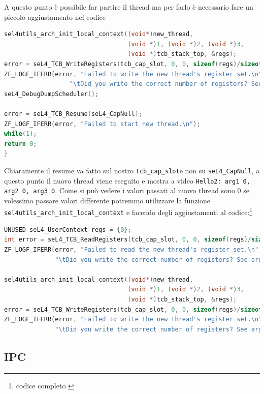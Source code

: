 A questo punto è possibile far partire il thread ma per farlo è necessario fare un piccolo aggiustamento nel codice 
\begin{lstlisting}[language=C++]
sel4utils_arch_init_local_context((void*)new_thread,
                                  (void *)1, (void *)2, (void *)3,
                                  (void *)tcb_stack_top, &regs);
error = seL4_TCB_WriteRegisters(tcb_cap_slot, 0, 0, sizeof(regs)/sizeof(seL4_Word), &regs);
ZF_LOGF_IFERR(error, "Failed to write the new thread's register set.\n"
                  "\tDid you write the correct number of registers? See arg4.\n");
seL4_DebugDumpScheduler();

error = seL4_TCB_Resume(seL4_CapNull);
ZF_LOGF_IFERR(error, "Failed to start new thread.\n");
while(1);
return 0;
}
\end{lstlisting}
Chiaramente il resume va fatto sul nostro \texttt{tcb\_cap\_slot}e non su \texttt{seL4\_CapNull}, a questo punto il nuovo thread viene eseguito e mostra a video \texttt{Hello2: arg1 0, arg2 0, arg3 0}.
Come si può vedere i valori passati al nuovo thread sono 0 se volessimo passare valori differente potremmo utilizzare la funzione \texttt{sel4utils\_arch\_init\_local\_context} e facendo degli aggiustamenti al codice:\footnote{codice completo \cite{threads}}
\begin{lstlisting}[language=C++]
UNUSED seL4_UserContext regs = {0};
int error = seL4_TCB_ReadRegisters(tcb_cap_slot, 0, 0, sizeof(regs)/sizeof(seL4_Word), &regs);
ZF_LOGF_IFERR(error, "Failed to read the new thread's register set.\n"
              "\tDid you write the correct number of registers? See arg4.\n");

sel4utils_arch_init_local_context((void*)new_thread,
                                  (void *)1, (void *)2, (void *)3,
                                  (void *)tcb_stack_top, &regs);
error = seL4_TCB_WriteRegisters(tcb_cap_slot, 0, 0, sizeof(regs)/sizeof(seL4_Word), &regs);
ZF_LOGF_IFERR(error, "Failed to write the new thread's register set.\n"
              "\tDid you write the correct number of registers? See arg4.\n");
\end{lstlisting}

\subsection{IPC}
